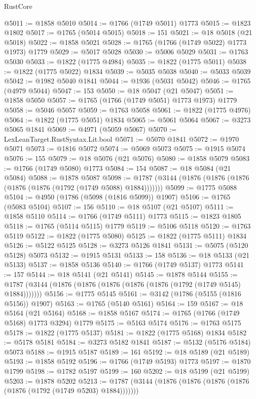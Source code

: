 \begin{lexlean}{RustCore}
\begin{coremodule}
@5011 := @1858 @5010
@5014 := @1766 (@1749 @5011) @1773
@5015 := @1823 @1802
@5017 := @1765 (@5014 @5015)
@5018 := 151
@5021 := @18 @5018 (@21 @5018)
@5022 := @1858 @5021
@5028 := @1765 (@1766 (@1749 @5022) @1773 @1973) @1779
@5029 := @5017 @5028
@5030 := @5006 @5029
@5031 := @1763 @5030
@5033 := @1822 (@1775 @4984)
@5035 := @1822 (@1775 @5011)
@5038 := @1822 (@1775 @5022) @1834
@5039 := @5035 @5038
@5040 := @5033 @5039
@5042 := @1982 @5040 @1841
@5044 := @1936 (@5031 @5042)
@5046 := @1765 (@4979 @5044)
@5047 := 153
@5050 := @18 @5047 (@21 @5047)
@5051 := @1858 @5050
@5057 := @1765 (@1766 (@1749 @5051) @1773 @1973) @1779
@5058 := @5046 @5057
@5059 := @1763 @5058
@5061 := @1822 (@1775 @4976)
@5064 := @1822 (@1775 @5051) @1834
@5065 := @5061 @5064
@5067 := @3273 @5065 @1841
@5069 := @4971 (@5059 @5067)
@5070 := LexLeanTarget.RustSyntax.Lit.bool
@5071 := @5070 @1841
@5072 := @1970 @5071
@5073 := @1816 @5072
@5074 := @5069 @5073
@5075 := @1915 @5074
@5076 := 155
@5079 := @18 @5076 (@21 @5076)
@5080 := @1858 @5079
@5083 := @1766 (@1749 @5080) @1773
@5084 := 154
@5087 := @18 @5084 (@21 @5084)
@5088 := @1878 @5087
@5098 := @1787 (@3144 (@1876 (@1876 (@1876 (@1876 (@1876 (@1792 (@1749 @5088) @1884)))))))
@5099 := @1775 @5088
@5104 := @4950 (@1786 (@5098 (@1816 @5099)) @1907)
@5106 := @1765 (@5083 @5104)
@5107 := 156
@5110 := @18 @5107 (@21 @5107)
@5111 := @1858 @5110
@5114 := @1766 (@1749 @5111) @1773
@5115 := @1823 @1805
@5118 := @1765 (@5114 @5115) @1779
@5119 := @5106 @5118
@5120 := @1763 @5119
@5122 := @1822 (@1775 @5080)
@5125 := @1822 (@1775 @5111) @1834
@5126 := @5122 @5125
@5128 := @3273 @5126 @1841
@5131 := @5075 (@5120 @5128) @5073
@5132 := @1915 @5131
@5133 := 158
@5136 := @18 @5133 (@21 @5133)
@5137 := @1858 @5136
@5140 := @1766 (@1749 @5137) @1773
@5141 := 157
@5144 := @18 @5141 (@21 @5141)
@5145 := @1878 @5144
@5155 := @1787 (@3144 (@1876 (@1876 (@1876 (@1876 (@1876 (@1792 (@1749 @5145) @1884)))))))
@5156 := @1775 @5145
@5161 := @3142 (@1786 (@5155 (@1816 @5156)) @1907)
@5163 := @1765 (@5140 @5161)
@5164 := 159
@5167 := @18 @5164 (@21 @5164)
@5168 := @1858 @5167
@5174 := @1765 (@1766 (@1749 @5168) @1773 @3294) @1779
@5175 := @5163 @5174
@5176 := @1763 @5175
@5178 := @1822 (@1775 @5137)
@5181 := @1822 (@1775 @5168) @1834
@5182 := @5178 @5181
@5184 := @3273 @5182 @1841
@5187 := @5132 (@5176 @5184) @5073
@5188 := @1915 @5187
@5189 := 161
@5192 := @18 @5189 (@21 @5189)
@5193 := @1858 @5192
@5196 := @1766 (@1749 @5193) @1773
@5197 := @1870 @1799
@5198 := @1782 @5197
@5199 := 160
@5202 := @18 @5199 (@21 @5199)
@5203 := @1878 @5202
@5213 := @1787 (@3144 (@1876 (@1876 (@1876 (@1876 (@1876 (@1792 (@1749 @5203) @1884)))))))

\end{coremodule}
\end{lexlean}
